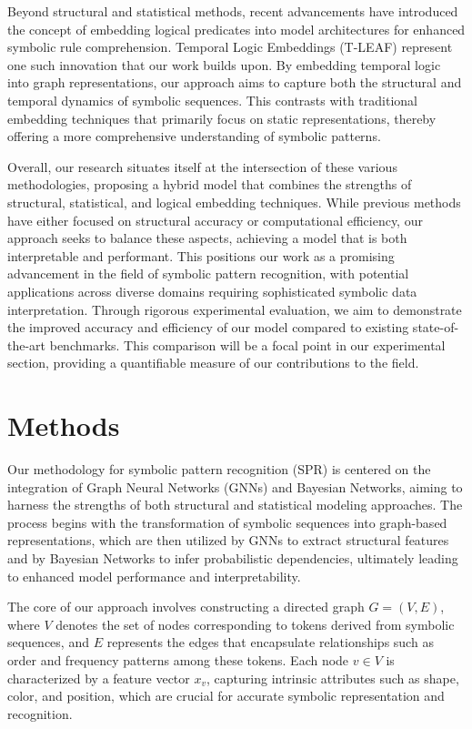 \documentclass{article}
\begin{document}
Beyond structural and statistical methods, recent advancements have introduced the concept of embedding logical predicates into model architectures for enhanced symbolic rule comprehension. Temporal Logic Embeddings (T-LEAF) represent one such innovation that our work builds upon. By embedding temporal logic into graph representations, our approach aims to capture both the structural and temporal dynamics of symbolic sequences. This contrasts with traditional embedding techniques that primarily focus on static representations, thereby offering a more comprehensive understanding of symbolic patterns.

Overall, our research situates itself at the intersection of these various methodologies, proposing a hybrid model that combines the strengths of structural, statistical, and logical embedding techniques. While previous methods have either focused on structural accuracy or computational efficiency, our approach seeks to balance these aspects, achieving a model that is both interpretable and performant. This positions our work as a promising advancement in the field of symbolic pattern recognition, with potential applications across diverse domains requiring sophisticated symbolic data interpretation. Through rigorous experimental evaluation, we aim to demonstrate the improved accuracy and efficiency of our model compared to existing state-of-the-art benchmarks. This comparison will be a focal point in our experimental section, providing a quantifiable measure of our contributions to the field.

\section{Methods}
Our methodology for symbolic pattern recognition (SPR) is centered on the integration of Graph Neural Networks (GNNs) and Bayesian Networks, aiming to harness the strengths of both structural and statistical modeling approaches. The process begins with the transformation of symbolic sequences into graph-based representations, which are then utilized by GNNs to extract structural features and by Bayesian Networks to infer probabilistic dependencies, ultimately leading to enhanced model performance and interpretability.

The core of our approach involves constructing a directed graph \( G = (V, E) \), where \( V \) denotes the set of nodes corresponding to tokens derived from symbolic sequences, and \( E \) represents the edges that encapsulate relationships such as order and frequency patterns among these tokens. Each node \( v \in V \) is characterized by a feature vector \( x_v \), capturing intrinsic attributes such as shape, color, and position, which are crucial for accurate symbolic representation and recognition.
\end{document}
